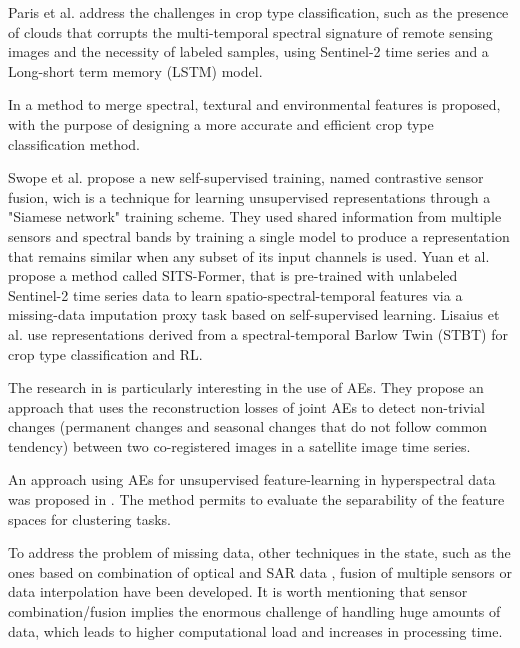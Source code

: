 \documentclass[journal,article,submit,pdftex,moreauthors]{Definitions/mdpi}
\begin{document}
Paris et al. \cite{Paris2020} address the challenges in crop type classification, such as the presence of clouds that
corrupts the multi-temporal spectral signature of remote sensing images and the necessity of labeled 
samples, using Sentinel-2 time series and a Long-short term memory (LSTM) model.

In \cite{He2022} a method to merge spectral, textural and environmental features is proposed, with the purpose of designing a more accurate and efficient crop 
type classification method.

Swope et al. \cite{Swope2021} propose a new self-supervised training, named contrastive sensor fusion, wich is a technique 
for learning unsupervised representations through a "Siamese network" training scheme. 
They used shared information from multiple sensors and spectral bands by training a single model to produce a representation that remains similar 
when any subset of its input channels is used. 
Yuan et al. \cite{Yuan2022} propose a method called SITS-Former, that is pre-trained with unlabeled Sentinel-2 time series data to learn spatio-spectral-temporal features via a missing-data imputation proxy task based on self-supervised learning.
Lisaius et al. \cite{Lisaius2024} use representations derived from a spectral-temporal Barlow Twin (STBT) for crop type classification and RL.

The research in \cite{Kalinicheva2019} is particularly interesting in the use of AEs. They propose an approach that uses the reconstruction
losses of joint AEs to detect non-trivial changes (permanent changes and seasonal changes that do not follow common tendency) between two 
co-registered images in a satellite image time series.

An approach using AEs for unsupervised feature-learning in hyperspectral data was proposed in \cite{Windrim2019}.
The method permits to evaluate the separability of the feature spaces for clustering tasks.

To address the problem of missing data, other techniques in the state, such as the ones based on combination of optical and SAR data \cite{Begue2018, Orynbaikyzy2019, Kussul2017}, 
fusion of multiple sensors \cite{PierrePott2022, Heupel2018,MorenoMartinez2020} or data interpolation \cite{Russwurm2020, Kandasamy2013} have been developed.
It is worth mentioning that sensor combination/fusion implies the enormous challenge of handling huge amounts of data,
which leads to higher computational load and increases in processing time.
\end{document}
